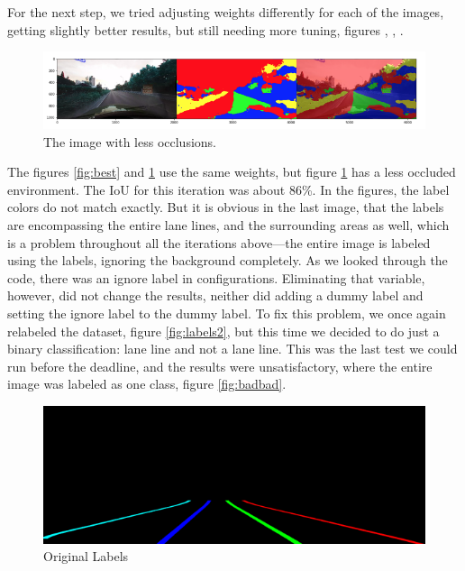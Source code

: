\documentclass[twoside,twocolumn]{article}
\begin{document}
\par For the next step, we tried adjusting weights differently for each of the images, getting slightly better results, but still needing more tuning, figures \label{fig:weights1}, \label{fig:weights2}, \label{fig:weights3}.

\begin{figure}
  \includegraphics[width=\linewidth]{6.png}
  \caption{The image with less occlusions.}
  \label{fig:occlusions}
\end{figure}

\par The figures \ref{fig:best} and \ref{fig:occlusions} use the same weights, but figure \ref{fig:occlusions} has a less occluded environment. The IoU for this iteration was about 86\%. In the figures, the label colors do not match exactly. But it is obvious in the last image, that the labels are encompassing the entire lane lines, and the surrounding areas as well, which is a problem throughout all the iterations above—the entire image is labeled using the labels, ignoring the background completely. As we looked through the code, there was an ignore label in configurations. Eliminating that variable, however, did not change the results, neither did adding a dummy label and setting the ignore label to the dummy label. To fix this problem, we once again relabeled the dataset, figure \ref{fig:labels2}, but this time we decided to do just a binary classification: lane line and not a lane line. This was the last test we could run before the deadline, and the results were unsatisfactory, where the entire image was labeled as one class, figure \ref{fig:badbad}.

\begin{figure}
  \includegraphics[width=\linewidth]{7.png}
  \caption{Original Labels}
  \label{fig:labels1}
\end{figure}
\end{document}
